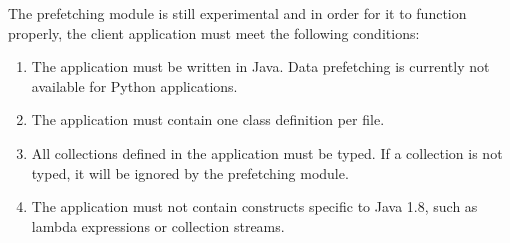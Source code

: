 The prefetching module is still experimental and in order for it to function properly, the client application must meet the following conditions:

\begin{enumerate}
    \item The application must be written in Java. Data prefetching is currently not available for Python applications.
    \item The application must contain one class definition per file.
    \item All collections defined in the application must be typed. If a collection is not typed, it will be ignored by the prefetching module.
    \item The application must not contain constructs specific to Java 1.8, such as lambda expressions or collection streams.
\end{enumerate}